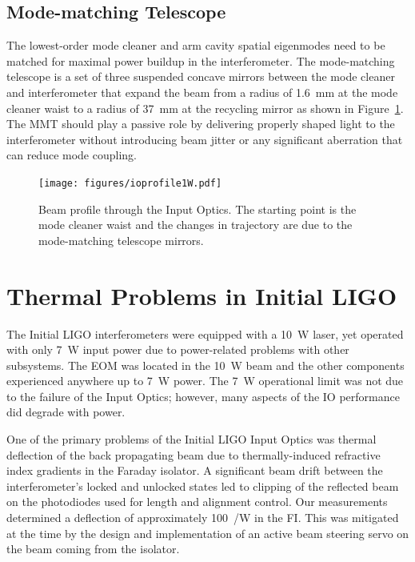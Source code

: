 \subsection{Mode-matching Telescope}
The lowest-order mode cleaner and arm cavity spatial eigenmodes need
to be matched for maximal power buildup in the interferometer. The
mode-matching telescope is a set of three suspended concave mirrors
between the mode cleaner and interferometer that expand the beam from
a radius of 1.6~mm at the mode cleaner waist to a radius of 37~mm at
the recycling mirror as shown in Figure~\ref{fig:ioprofile}. The MMT
should play a passive role by delivering properly shaped light to the
interferometer without introducing beam jitter or any significant
aberration that can reduce mode coupling.

\begin{figure}
\begin{centering}
\texttt{[image: figures/ioprofile1W.pdf]}
\caption[Beam profile through the Input Optics]{Beam profile through
  the Input Optics. The starting point is the mode cleaner waist and
  the changes in trajectory are due to the mode-matching telescope
  mirrors.}
\label{fig:ioprofile}
\end{centering}
\end{figure}

\section{Thermal Problems in Initial LIGO}
\label{sec:problems}
The Initial LIGO interferometers were equipped with a 10~W laser, yet
operated with only 7~W input power due to power-related problems with
other subsystems. The EOM was located in the 10~W beam and the other
components experienced anywhere up to 7~W power. The 7~W operational
limit was not due to the failure of the Input Optics; however, many
aspects of the IO performance did degrade with power.

One of the primary problems of the Initial LIGO Input Optics
\citep{Adhikari1998Input} was thermal deflection of the back
propagating beam due to thermally-induced refractive index gradients
in the Faraday isolator. A significant beam drift between the
interferometer's locked and unlocked states led to clipping of the
reflected beam on the photodiodes used for length and alignment
control. Our measurements determined a deflection of approximately
100~\microrad/W in the FI.  This was mitigated at the time by the
design and implementation of an active beam steering servo on the beam
coming from the isolator.

